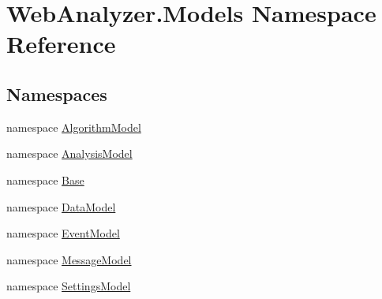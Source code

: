\hypertarget{namespace_web_analyzer_1_1_models}{}\section{Web\+Analyzer.\+Models Namespace Reference}
\label{namespace_web_analyzer_1_1_models}
\subsection*{Namespaces}
\begin{DoxyCompactItemize}
\item 
namespace \hyperlink{namespace_web_analyzer_1_1_models_1_1_algorithm_model}{Algorithm\+Model}
\item 
namespace \hyperlink{namespace_web_analyzer_1_1_models_1_1_analysis_model}{Analysis\+Model}
\item 
namespace \hyperlink{namespace_web_analyzer_1_1_models_1_1_base}{Base}
\item 
namespace \hyperlink{namespace_web_analyzer_1_1_models_1_1_data_model}{Data\+Model}
\item 
namespace \hyperlink{namespace_web_analyzer_1_1_models_1_1_event_model}{Event\+Model}
\item 
namespace \hyperlink{namespace_web_analyzer_1_1_models_1_1_message_model}{Message\+Model}
\item 
namespace \hyperlink{namespace_web_analyzer_1_1_models_1_1_settings_model}{Settings\+Model}
\end{DoxyCompactItemize}
